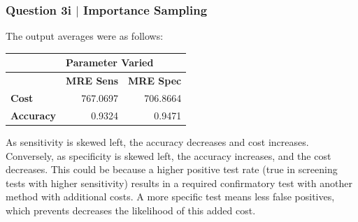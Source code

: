 \documentclass[aspectratio=1610]{beamer}
\begin{document}
\begin{frame}
\frametitle{Question 3i $|$ Importance Sampling}
The output averages were as follows:
\vspace{1em}
\begin{table}[htbp]
\begin{tabular}{|l|l|l|}
\hline
 & \multicolumn{ 2}{l|}{\textbf{\hspace{1em} Parameter Varied}} \\ \hline
 & \textbf{MRE Sens} & \textbf{MRE Spec} \\ \hline
\textbf{Cost} & \multicolumn{1}{r|}{767.0697} & \multicolumn{1}{r|}{706.8664} \\ \hline
\textbf{Accuracy} & \multicolumn{1}{r|}{0.9324} & \multicolumn{1}{r|}{0.9471} \\ \hline
\end{tabular}\end{table}
\vspace{1em}
As sensitivity is skewed left, the accuracy decreases and cost increases. Conversely, as specificity is skewed left, the accuracy increases, and the cost decreases. This could be because a higher positive test rate (true in screening tests with higher sensitivity) results in a required confirmatory test with another method with additional costs. A more specific test means less false positives, which prevents decreases the likelihood of this added cost.  
\end{frame}
\end{document}
